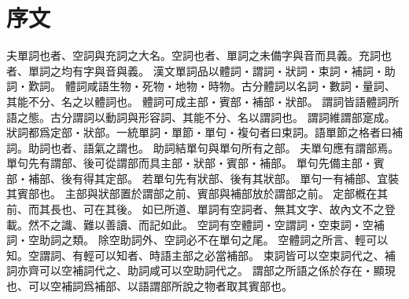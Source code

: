 \chapter*{序文}
夫單詞也者、空詞與充詞之大名。空詞也者、單詞之未備字與音而具義。充詞也者、單詞之均有字與音與義。
漢文單詞品以體詞・謂詞・狀詞・束詞・補詞・助詞・歎詞。
體詞咸語生物・死物・地物・時物。古分體詞以名詞・數詞・量詞、其能不分、名之以體詞也。
體詞可成主部・賓部・補部・狀部。
謂詞皆語體詞所語之態。古分謂詞以動詞與形容詞、其能不分、名以謂詞也。
謂詞維謂部寔成。
狀詞都爲定部・狀部。一統單詞・單節・單句・複句者曰束詞。語單節之格者曰補詞。助詞也者、語氣之謂也。
助詞結單句與單句所有之部。
夫單句應有謂部焉。
單句先有謂部、後可從謂部而具主部・狀部・賓部・補部。
單句先備主部・賓部・補部、後有得其定部。
若單句先有狀部、後有其狀部。
單句一有補部、宜裝其賓部也。
主部與狀部置於謂部之前、賓部與補部放於謂部之前。
定部槪在其前、而其長也、可在其後。
如已所道、單詞有空詞者、無其文字、故內文不之登載。然不之識、難以善讀、而記如此。
空詞有空體詞・空謂詞・空束詞・空補詞・空助詞之類。
除空助詞外、空詞必不在單句之尾。
空體詞之所言、輕可以知。空謂詞、有輕可以知者、時語主部之必當補部。
束詞皆可以空束詞代之、補詞亦齊可以空補詞代之、助詞咸可以空助詞代之。
謂部之所語之係於存在・顯現也、可以空補詞爲補部、以語謂部所說之物者取其賓部也。
